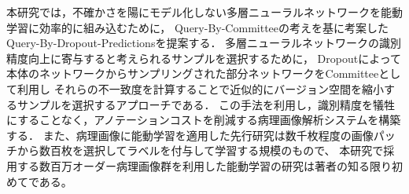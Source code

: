 本研究では，不確かさを陽にモデル化しない多層ニューラルネットワークを能動学習に効率的に組み込むために，
Query-By-Committeeの考えを基に考案したQuery-By-Dropout-Predictionsを提案する．
多層ニューラルネットワークの識別精度向上に寄与すると考えられるサンプルを選択するために，
Dropoutによって本体のネットワークからサンプリングされた部分ネットワークをCommitteeとして利用し
それらの不一致度を計算することで近似的にバージョン空間を縮小するサンプルを選択するアプローチである．
この手法を利用し，識別精度を犠牲にすることなく，アノテーションコストを削減する病理画像解析システムを構築する．
また、病理画像に能動学習を適用した先行研究は数千枚程度の画像パッチから数百枚を選択してラベルを付与して学習する規模のもので、
本研究で採用する数百万オーダー病理画像群を利用した能動学習の研究は著者の知る限り初めてである。

